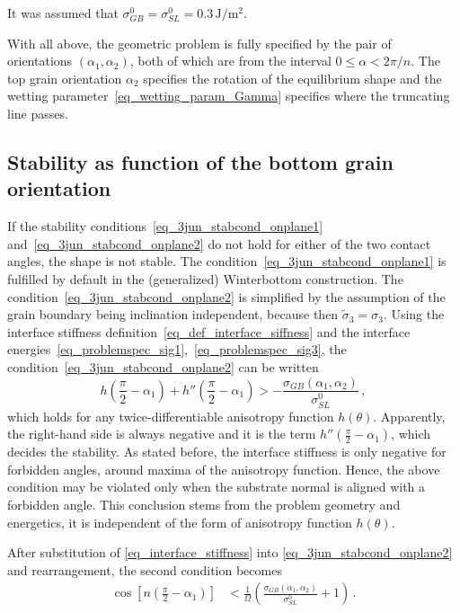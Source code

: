It was assumed that $\sigma_{GB}^0=\sigma_{SL}^0=0.3\,\mathrm{J/m^2}$.

With all above, the geometric problem is fully specified by the pair of orientations $(\alpha_1,\alpha_2)$, both of which are from the interval $0 \leq \alpha < 2\pi/n$. The top grain orientation $\alpha_2$ specifies the rotation of the equilibrium shape and the wetting parameter~\eqref{eq_wetting_param_Gamma} specifies where the truncating line passes.    

\subsection{Stability as function of the bottom grain orientation}
If the stability conditions~\eqref{eq_3jun_stabcond_onplane1} and~\eqref{eq_3jun_stabcond_onplane2} do not hold for either of the two contact angles, the shape is not stable. The condition~\eqref{eq_3jun_stabcond_onplane1} is fulfilled by default in the (generalized) Winterbottom construction. The condition~\eqref{eq_3jun_stabcond_onplane2} is simplified by the assumption of the grain boundary being inclination independent, because then $\tilde{\sigma}_3=\sigma_3$. Using the interface stiffness definition~\eqref{eq_def_interface_siffness} and the interface energies~\eqref{eq_problemspec_sig1},~\eqref{eq_problemspec_sig3}, the condition~\eqref{eq_3jun_stabcond_onplane2} can be written
\begin{equation} \label{eq_stabcond_general_explicit}
	\textstyle h(\frac{\pi}{2}-\alpha_1) + h''(\frac{\pi}{2}-\alpha_1) > \displaystyle -\frac{\sigma_{GB}(\alpha_1,\alpha_2)}{\sigma_{SL}^0} \,,
\end{equation}
which holds for any twice-differentiable anisotropy function $h(\theta)$. Apparently, the right-hand side is always negative and it is the term $h''(\frac{\pi}{2}-\alpha_1)$, which decides the stability. As stated before, the interface stiffness is only negative for forbidden angles, around maxima of the anisotropy function. Hence, the above condition may be violated only when the substrate normal is aligned with a forbidden angle. This conclusion stems from the problem geometry and energetics, it is independent of the form of anisotropy function $h(\theta)$.

After substitution of \eqref{eq_interface_stiffness} into \eqref{eq_3jun_stabcond_onplane2} and rearrangement, the second condition becomes
\begin{align}
	\textstyle\cos\left[n(\frac{\pi}{2}-\alpha_1)\right]&<\frac{1}{\Omega}\left(\frac{\sigma_{GB}(\alpha_1,\alpha_2)}{\sigma_{SL}^0}+1\right) \,. \label{eq_3jun_stabcond_applied}
\end{align}

